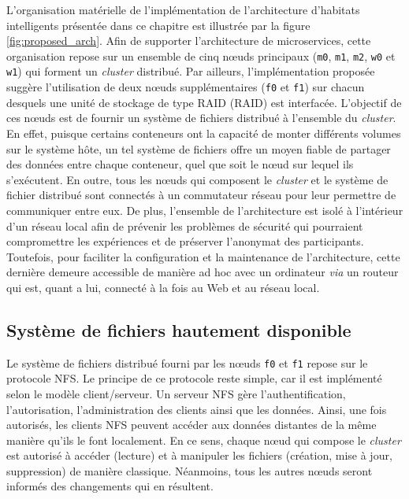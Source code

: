 L'organisation matérielle de l'implémentation de l'architecture d'habitats intelligents présentée dans ce chapitre est illustrée par la figure \ref{fig:proposed_arch}. Afin de supporter l'architecture de microservices, cette organisation repose sur un ensemble de cinq n\oe{}uds principaux (\texttt{m0}, \texttt{m1}, \texttt{m2}, \texttt{w0} et \texttt{w1}) qui forment un \textit{cluster} distribué. Par ailleurs, l'implémentation proposée suggère l'utilisation de deux n\oe{}uds supplémentaires (\texttt{f0} et \texttt{f1}) sur chacun desquels une unité de stockage de type \acs{RAID} (\acl{RAID}) est interfacée. L'objectif de ces n\oe{}uds est de fournir un système de fichiers distribué à l'ensemble du \textit{cluster}. En effet, puisque certains conteneurs ont la capacité de monter différents volumes sur le système hôte, un tel système de fichiers offre un moyen fiable de partager des données entre chaque conteneur, quel que soit le n\oe{}ud sur lequel ils s'exécutent. En outre, tous les n\oe{}uds qui composent le \textit{cluster} et le système de fichier distribué sont connectés à un commutateur réseau pour leur permettre de communiquer entre eux. De plus, l'ensemble de l'architecture est isolé à l'intérieur d'un réseau local afin de prévenir les problèmes de sécurité qui pourraient compromettre les expériences et de préserver l'anonymat des participants. Toutefois, pour faciliter la configuration et la maintenance de l'architecture, cette dernière demeure accessible de manière ad hoc avec un ordinateur \textit{via} un routeur qui est, quant a lui, connecté à la fois au Web et au réseau local.

\subsection{Système de fichiers hautement disponible}

Le système de fichiers distribué fourni par les n\oe{}uds \texttt{f0} et \texttt{f1} repose sur le protocole \ac{NFS}. Le principe de ce protocole reste simple, car il est implémenté selon le modèle client/serveur. Un serveur \acs{NFS} gère l'authentification, l'autorisation, l'administration des clients ainsi que les données. Ainsi, une fois autorisés, les clients NFS peuvent accéder aux données distantes de la même manière qu'ils le font localement. En ce sens, chaque n\oe{}ud qui compose le \textit{cluster} est autorisé à accéder (lecture) et à manipuler les fichiers (création, mise à jour, suppression) de manière classique. Néanmoins, tous les autres n\oe{}uds seront informés des changements qui en résultent.

